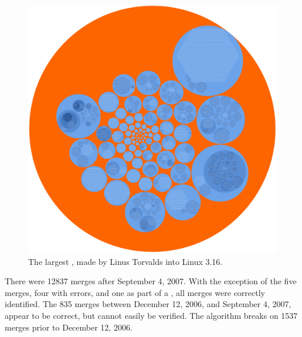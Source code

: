 \begin{figure}[htpb]
  \centering
  \includegraphics[width=0.8\linewidth]{Figures/model/big_tree.pdf}
  \caption{The largest \mt{}, made by Linus Torvalds into Linux 3.16.}
  \label{fig:big_tree}
\end{figure}

There were 12837 merges after September 4, 2007. With the exception of
the five merges, four with errors, and one as part of a \foxtrot{}, all
merges were correctly identified. The 835 merges between December 12,
2006, and September 4, 2007, appear to be correct, but cannot easily be
verified. The algorithm breaks on 1537 merges prior to December 12,
2006.
